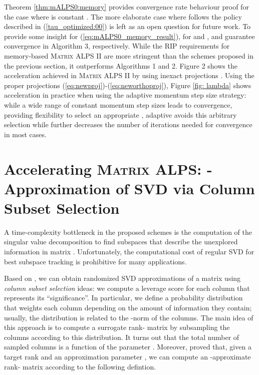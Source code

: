 \documentclass[twocolumn]{svjour3}
\begin{document}
Theorem \ref{thm:mALPS0:memory} provides convergence rate behaviour proof for the case where  is constant . The more elaborate case where  follows the policy described in (\ref{tau_optimized:00}) is left as an open question for future work. To provide some insight for (\ref{eq:mALPS0_memory_result}), for  and ,  and  guarantee convergence in Algorithm 3, respectively. While the RIP requirements for memory-based \textsc{Matrix ALPS II} are more stringent than the schemes proposed in the previous section, it outperforms Algorithms 1 and 2. Figure 2 shows the acceleration achieved in \textsc{Matrix ALPS II} by using inexact projections . Using the proper projections (\ref{eq:newproj})-(\ref{eq:neworthoproj}), Figure \ref{fig: lambda} shows acceleration in practice when using the adaptive momentum step size strategy: while a wide range of constant momentum step sizes leads to convergence, providing flexibility to select an appropriate , adaptive  avoids this arbitrary  selection while further decreases the number of iterations needed for convergence in most cases.  

\section{Accelerating \textsc{Matrix ALPS}: -Approximation of SVD via Column Subset Selection}{\label{section:approximate}}

A time-complexity bottleneck in the proposed schemes is the computation of the singular value decomposition to find subspaces that  describe the unexplored information in matrix . Unfortunately, the computational cost of regular SVD for best subspace tracking is prohibitive for many applications. 

Based on \cite{drineas1, drineas2},  we can obtain randomized SVD approximations of a matrix  using {\it column subset selection} ideas: we compute a leverage score for each column that represents its ``significance''. In particular, we define a probability distribution that weights each column depending on the amount of information they contain; usually, the distribution is related to the -norm of the columns. The main idea of this approach is to compute a surrogate rank- matrix  by subsampling the columns according to this distribution. It turns out that the total number of sampled columns is a function of the parameter .  Moreover, \cite{deshpande1, deshpande2} proved that, given a target rank  and an approximation parameter , we can compute an -approximate rank- matrix  according to the following defintion.
\end{document}
